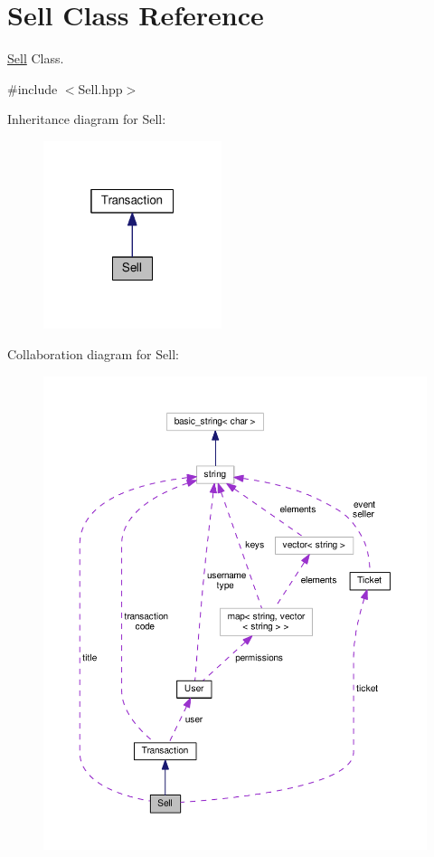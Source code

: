 \hypertarget{class_sell}{\section{Sell Class Reference}
\label{class_sell}
}


\hyperlink{class_sell}{Sell} Class.  




{\ttfamily \#include $<$Sell.\-hpp$>$}



Inheritance diagram for Sell\-:\nopagebreak
\begin{figure}[H]
\begin{center}
\leavevmode
\includegraphics[width=148pt]{class_sell__inherit__graph}
\end{center}
\end{figure}


Collaboration diagram for Sell\-:\nopagebreak
\begin{figure}[H]
\begin{center}
\leavevmode
\includegraphics[width=350pt]{class_sell__coll__graph}
\end{center}
\end{figure}

